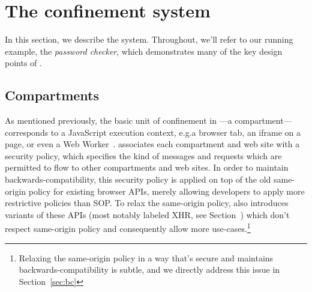 \section{The \sys{} confinement system}
\label{sec:system}

In this section, we describe the \sys{} system.
%
Throughout, we'll refer to our running example, the \emph{password
checker}, which demonstrates many of the key design points of \sys{}.

\subsection{Compartments}




As mentioned previously, the basic unit of confinement in \sys{}---a
compartment---corresponds to a JavaScript execution context, e.g.\@ a
browser tab, an iframe on a page, or even a Web Worker~\cite{workers}.
%
\sys{} associates each compartment and web site with a security policy,
which specifies the kind of messages and requests which are permitted to
flow to other compartments and web sites.
%
In order to maintain backwards-compatibility, this security policy is
applied on top of the old same-origin policy for existing browser APIs,
merely allowing developers to apply more restrictive policies than
SOP\@.
%
To relax the same-origin policy, \sys{} also introduces variants of
these APIs (most notably labeled XHR, see Section~) which don't
respect same-origin policy and consequently allow more
use-cases.\footnote{Relaxing the same-origin policy in a way that's
secure and maintains backwards-compatibility is subtle, and we directly
address this issue in Section~\ref{sec:bc}}


